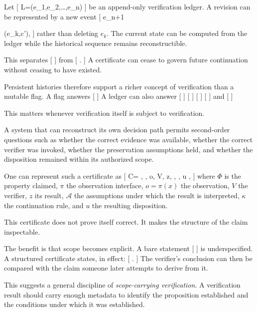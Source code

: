 \documentclass[11pt]{article}
\begin{document}
Let
[
L=(e_1,e_2,\ldots,e_n)
]
be an append-only verification ledger. A revision can be represented by a new event
[
e_{n+1}

(e_k,c'),
]
rather than deleting $e_k$. The current state can be computed from the ledger while the historical sequence remains reconstructible.

This separates
[
]
from
[
.
]
A certificate can cease to govern future continuation without ceasing to have existed.

Persistent histories therefore support a richer concept of verification than a mutable flag. A flag answers
[
]
A ledger can also answer
[
]
[
]
[
]
[
]
and
[
]

This matters whenever verification itself is subject to verification.

A system that can reconstruct its own decision path permits second-order questions such as whether the correct evidence was available, whether the correct verifier was invoked, whether the preservation assumptions held, and whether the disposition remained within its authorized scope.

One can represent such a certificate as
[
C=
\langle
\Phi,
\pi,
o,
V,
z,
,
\kappa,
u
\rangle,
]
where $\Phi$ is the property claimed, $\pi$ the observation interface, $o=\pi(x)$ the observation, $V$ the verifier, $z$ its result, $\mathcal{A}$ the assumptions under which the result is interpreted, $\kappa$ the continuation rule, and $u$ the resulting disposition.

This certificate does not prove itself correct. It makes the structure of the claim inspectable.

The benefit is that scope becomes explicit. A bare statement
[
]
is underspecified. A structured certificate states, in effect:
[
\Phi
{}\pi
{}.
]
The verifier's conclusion can then be compared with the claim someone later attempts to derive from it.

This suggests a general discipline of \emph{scope-carrying verification}. A verification result should carry enough metadata to identify the proposition established and the conditions under which it was established.
\end{document}
